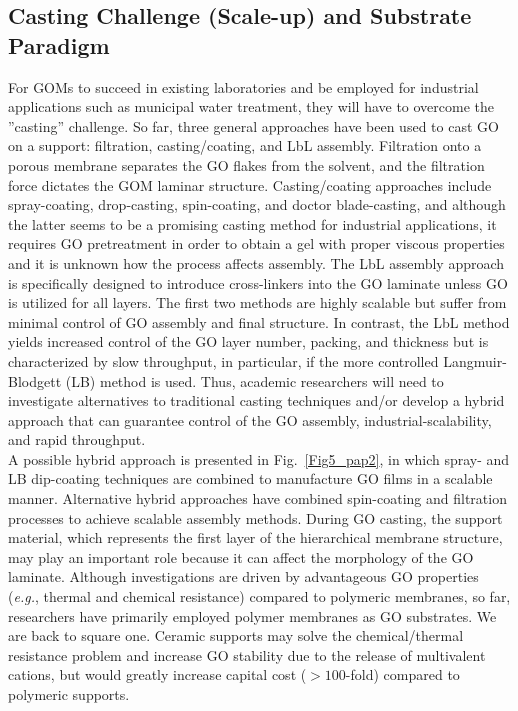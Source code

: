 \subsection{Casting Challenge (Scale-up) and Substrate Paradigm}
For GOMs to succeed in existing laboratories and be employed for industrial applications such as municipal water treatment, they will have to overcome the ''casting'' challenge. So far, three general approaches have been used to cast GO on a support: filtration, casting/coating, and LbL assembly. Filtration onto a porous membrane separates the GO flakes from the solvent, and the filtration force dictates the GOM laminar structure.\cite{hung2014pressure,tsou2015effect} Casting/coating approaches include spray-coating, drop-casting, spin-coating, and doctor blade-casting,\cite{nair2012unimpeded,hongfei2015transparent} and although the latter seems to be a promising casting method for industrial applications,\cite{akbari2016large} it requires GO pretreatment in order to obtain a gel with proper viscous properties and it is unknown how the process affects assembly. The LbL assembly approach is specifically designed to introduce cross-linkers into the GO laminate unless GO is utilized for all layers. The first two methods are highly scalable but suffer from minimal control of GO assembly and final structure. In contrast, the LbL method yields increased control of the GO layer number, packing, and thickness but is characterized by slow throughput, in particular, if the more controlled Langmuir-Blodgett (LB) method is used.\cite{Kim2010} Thus, academic researchers will need to investigate alternatives to traditional casting techniques and/or develop a hybrid approach that can guarantee control of the GO assembly, industrial-scalability, and rapid throughput.\\
A possible hybrid approach is presented in Fig.~\ref{Fig5_pap2}, in which spray- and LB dip-coating techniques are combined to manufacture GO films in a scalable manner. Alternative hybrid approaches have combined spin-coating and filtration processes to achieve scalable assembly methods.\cite{shen2016subnanometer}
During GO casting, the support material, which represents the first layer of the hierarchical membrane structure, may play an important role because it can affect the morphology of the GO laminate.\cite{tang2016vacuum} Although investigations are driven by advantageous GO properties (\textit{e.g.}, thermal and chemical resistance) compared to polymeric membranes, so far, researchers have primarily employed polymer membranes as GO substrates. We are back to square one. Ceramic supports may solve the chemical/thermal resistance problem and increase GO stability due to the release of multivalent cations, but would greatly increase capital cost ($>100$-fold) compared to polymeric supports.\\
